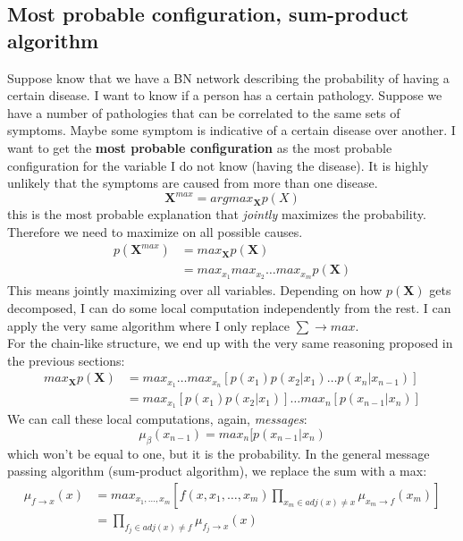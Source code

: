     \subsection{Most probable configuration, sum-product algorithm}
        Suppose know that we have a BN network describing the probability of having a certain disease. I want to know if a person has a certain pathology. Suppose we have a number of pathologies that can be correlated to the same sets of symptoms. Maybe some symptom is indicative of a certain disease over another.
        I want to get the \textbf{most probable configuration} as the most probable configuration for the variable I do not know (having the disease). It is highly unlikely that the symptoms are caused from more than one disease.
        $$\textbf{X}^{max} = argmax _{\textbf{X}} p(X)$$
        this is the most probable explanation that \textit{jointly} maximizes the probability.
        Therefore we need to maximize on all possible causes.
        \begin{align*}
            p(\textbf{X}^{max}) &= max_{\textbf{X}} p(\textbf{X})\\
            &= max_{x_1} max_{x_2} \dots max_{x_m} p(\textbf{X})
        \end{align*}
        This means jointly maximizing over all variables. Depending on how $p(\textbf{X})$ gets decomposed, I can do some local computation independently from the rest. 
        I can apply the very same algorithm where I only replace $\sum \rightarrow max$.\\
        For the chain-like structure, we end up with the very same reasoning proposed in the previous sections:
        \begin{align*}
            max_{\textbf{X}} p(\textbf{X}) &= max_{x_1}\dots max_{x_n} [p(x_1)p(x_2|x_1)\dots p(x_n|x_{n-1})]\\
            &= max_{x_1}[p(x_1)p(x_2|x_1)]\dots max_{n}[p(x_{n-1}|x_n)]
        \end{align*}
        We can call these local computations, again, \textit{messages}:
        $$\mu_\beta (x_{n-1}) = max_{n}[p(x_{n-1}|x_n)$$
        which won't be equal to one, but it is the probability.
        In the general message passing algorithm (sum-product algorithm), we replace the sum with a max:
        \begin{align*}
            \mu_{f \rightarrow x} (x) &= max_{x_1, \dots, x_m} \left[ f(x, x_1, \dots, x_m) \prod _{x_m \in adj(x) \neq x} \mu_{x_m \rightarrow f}(x_m) \right]\\
            &= \prod_{f_j \in adj(x) \neq f} \mu_{f_j \rightarrow x}(x)
        \end{align*}
        
